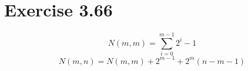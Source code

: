 \section{Exercise 3.66}

\[ N(m,m) = \sum_{i=0}^{m-1} 2^i - 1 \]
\[ N(m,n) = N(m,m) + 2^{m-1} + 2^m (n-m-1) \]
